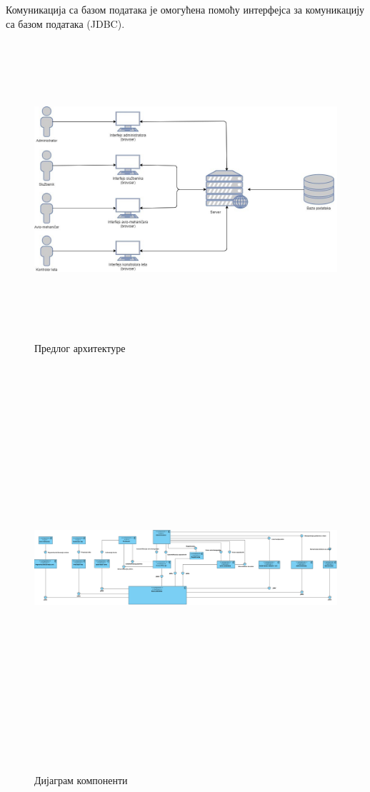 \documentclass{article}
\begin{document}
Комуникација са базом података је омогућена помоћу интерфејса за комуникацију са базом података (JDBC).

\begin{figure}[H]
    \begin{center}
        \includegraphics[width=1.1\textwidth, height=11cm]{Dijagrami_slike/predlog_arhitekture.jpg}
        \caption{Предлог архитектуре}
    \end{center}
\end{figure}

\begin{figure}[H]
    \begin{center}
        \includegraphics[width=1.1\textwidth, height=15cm]{Dijagrami_slike/dijagram_komponenti.jpg}
        \caption{Дијаграм компоненти}
    \end{center}
\end{figure}
\end{document}
